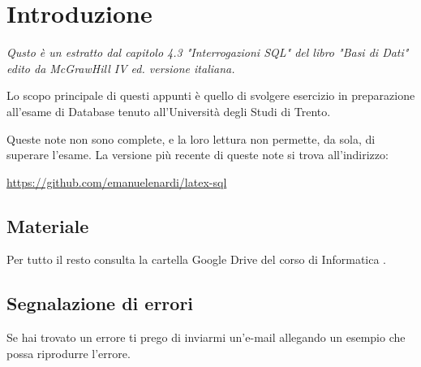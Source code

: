 \section*{Introduzione}

\emph{Qusto è un estratto dal capitolo 4.3 "Interrogazioni SQL" del libro "Basi di Dati" edito da McGrawHill IV ed. versione italiana.}

Lo scopo principale di questi appunti è quello di svolgere esercizio in preparazione all'esame di Database tenuto all'Università degli Studi di Trento.

Queste note non sono complete, e la loro lettura non permette, da sola, di superare l’esame. La versione più recente di queste note si trova all'indirizzo:

\begin{center}
	\url{https://github.com/emanuelenardi/latex-sql}
\end{center}

\subsection*{Materiale}

Per tutto il resto consulta la cartella Google Drive del corso di Informatica %
\href{https://bit.ly/drive-folder}{\ExternalLink}.

\subsection*{Segnalazione di errori}

Se hai trovato un errore ti prego di inviarmi un'e-mail \href{mailto:emanuele.nardi@studenti.unitn.it}{\ExternalLink} allegando un esempio che possa riprodurre l'errore.

